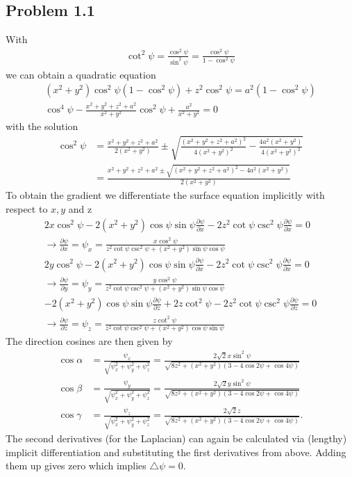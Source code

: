 \documentclass[10pt,a4paper]{book}
\theoremstyle{definition}
\begin{document}
\subsection{Problem 1.1}
With
\begin{align}
    \cot^2\psi=\frac{\cos^2\psi}{\sin^2\psi}=\frac{\cos^2\psi}{1-\cos^2\psi}
\end{align}
we can obtain a quadratic equation
\begin{align}
    (x^2+y^2)\cos^2\psi(1-\cos^2\psi)+z^2\cos^2\psi=a^2(1-\cos^2\psi)\\
    \cos^4\psi-\frac{x^2+y^2+z^2+a^2}{x^2+y^2}\cos^2\psi+\frac{a^2}{x^2+y^2}=0
\end{align}
with the solution
\begin{align}
    \cos^2\psi
    &=\frac{x^2+y^2+z^2+a^2}{2(x^2+y^2)}\pm\sqrt{ \frac{(x^2+y^2+z^2+a^2)^2}{4(x^2+y^2)^2}-\frac{4a^2(x^2+y^2)}{4(x^2+y^2)^2}  }\\
    &=\frac{x^2+y^2+z^2+a^2\pm\sqrt{ (x^2+y^2+z^2+a^2)^2-4a^2(x^2+y^2)}}{2(x^2+y^2)}
\end{align}
To obtain the gradient we differentiate the surface equation implicitly with respect to $x,y$ and z
\begin{align}
    2x\cos^2\psi-2(x^2+y^2)\cos\psi\sin\psi\frac{\partial\psi}{\partial x}-2z^2\cot\psi\csc^2\psi\frac{\partial\psi}{\partial x}=0\\
    \rightarrow\frac{\partial\psi}{\partial x}=\psi_x=\frac{x\cos^2\psi}{z^2\cot\psi\csc^2\psi+(x^2+y^2)\sin\psi\cos\psi}\\
    2y\cos^2\psi-2(x^2+y^2)\cos\psi\sin\psi\frac{\partial\psi}{\partial x}-2z^2\cot\psi\csc^2\psi\frac{\partial\psi}{\partial x}=0\\
    \rightarrow\frac{\partial\psi}{\partial y}=\psi_y=\frac{y\cos^2\psi}{z^2\cot\psi\csc^2\psi+(x^2+y^2)\sin\psi\cos\psi}\\
    -2(x^2+y^2)\cos\psi\sin\psi\frac{\partial\psi}{\partial z}+2z\cot^2\psi-2z^2\cot\psi\csc^2\psi\frac{\partial\psi}{\partial z}=0\\
     \rightarrow\frac{\partial\psi}{\partial z}=\psi_z=\frac{z\cot^2\psi}{z^2\cot\psi\csc^2\psi + (x^2+y^2)\cos\psi\sin\psi}
\end{align}
The direction cosines are then given by
\begin{align}
    \cos\alpha&=\frac{\psi_x}{\sqrt{\psi_x^2+\psi_y^2+\psi_z^2}}=\frac{2\sqrt{2}x\sin^2\psi}{\sqrt{8z^2+(x^2+y^2)(3-4\cos2\psi+\cos4\psi)}}\\
    \cos\beta&=\frac{\psi_y}{\sqrt{\psi_x^2+\psi_y^2+\psi_z^2}}=\frac{2\sqrt{2}y\sin^2\psi}{\sqrt{8z^2+(x^2+y^2)(3-4\cos2\psi+\cos4\psi)}}\\
    \cos\gamma&=\frac{\psi_z}{\sqrt{\psi_x^2+\psi_y^2+\psi_z^2}}=\frac{2\sqrt{2}z}{\sqrt{8z^2+(x^2+y^2)(3-4\cos2\psi+\cos4\psi)}}.
\end{align}
The second derivatives (for the Laplacian) can again be calculated via (lengthy) implicit differentiation and substituting the first derivatives from above. Adding them up gives zero which implies $\triangle\psi=0$.
\end{document}
